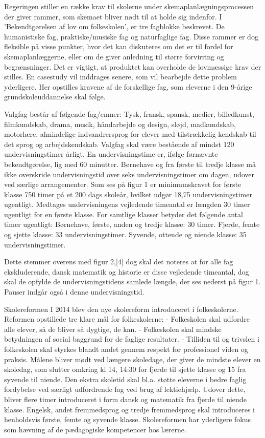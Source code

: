 Regeringen stiller en række krav til skolerne under skemaplanlægningsprocessen der giver rammer, som skemaet bliver nødt til at holde sig indenfor. I 'Bekendtgørelsen af lov om folkeskolen', er tre fagblokke beskrevet. De humanistiske fag, praktiske/musiske fag og naturfaglige fag. Disse rammer er dog fleksible på visse punkter, hvor det kan diskuteres om det er til fordel for skemaplanlæggerne, eller om de giver anledning til større forvirring og begrænsninger. Det er vigtigt, at produktet kan overholde de lovmæssige krav der stilles. En casestudy vil inddrages senere, som vil bearbejde dette problem yderligere. Her opstilles kravene af de forskellige fag, som eleverne i den 9-årige grundskoleuddannelse skal følge\cite{biblop1:14}.

 Valgfag består af følgende fag/emner: Tysk, fransk, spansk, medier, billedkunst, filmkundskab, drama, musik, håndarbejde og design, sløjd, madkundskab, motorlære, almindelige indvandrersprog for elever med tilstrækkelig kendskab til det sprog og arbejdskendskab.
Valgfag skal være bestående af mindst 120 undervisningstimer årligt\cite{biblop1:13}.
En undervisningstime er, ifølge førnævnte bekendtgørelse, lig med 60 minutter. Børnehave og fra første til tredje klasse må ikke overskride undervisningstid over seks undervisningstimer om dagen, udover ved særlige arrangementer.
Som ses på figur 1 er minimumskravet for første klasse 750 timer på et 200 dags skoleår, hvilket udgør 18,75 undervisningstimer ugentligt\cite{biblop1:16}.
Medtages undervisningens vejledende timeantal er længden 30 timer ugentligt for en første klasse. For samtlige klasser betyder det følgende antal timer ugentligt:
Børnehave, første, anden og tredje klasse: 30 timer.
Fjerde, femte og sjette klasse: 33 undervisningstimer.
Syvende, ottende og niende klasse: 35 undervisningstimer\cite{biblop1:16}.

Dette stemmer overens med figur 2,[4] dog skal det noteres at for alle fag ekskluderende, dansk matematik og historie\cite{biblop1:16} er disse vejledende timeantal, dog skal de opfylde de undervisningstidens samlede længde, der ses nederst på figur 1. Pauser indgår også i denne undervisningstid\cite{biblop1:15}.
 	
Skolereformen
I 2014 blev den nye skolereform introduceret i folkeskolerne. Reformen opstillede tre klare mål for folkeskolerne\cite{biblop1:11}:
-	Folkeskolen skal udfordre alle elever, så de bliver så dygtige, de kan.
-	Folkeskolen skal mindske betydningen af social baggrund for de faglige resultater.
-	Tilliden til og trivslen i folkeskolen skal styrkes blandt andet gennem respekt for professionel viden og praksis.
Målene bliver mødt ved længere skoledage, der giver de mindste elever en skoledag, som slutter omkring kl 14, 14:30 for fjerde til sjette klasse og 15 fra syvende til niende. Den ekstra skoletid skal bl.a. støtte eleverne i bedre faglig fordybelse ved særligt udfordrende fag ved brug af lektiehjælp. Udover dette, bliver flere timer introduceret i form dansk og matematik fra fjerde til niende klasse. Engelsk, andet fremmedsprog og tredje fremmedsprog skal introduceres i henholdsvis første, femte og syvende klasse\cite{biblop1:11}.
Skolereformen har yderligere fokus som hævning af de pædagogiske kompetencer hos lærerne.
